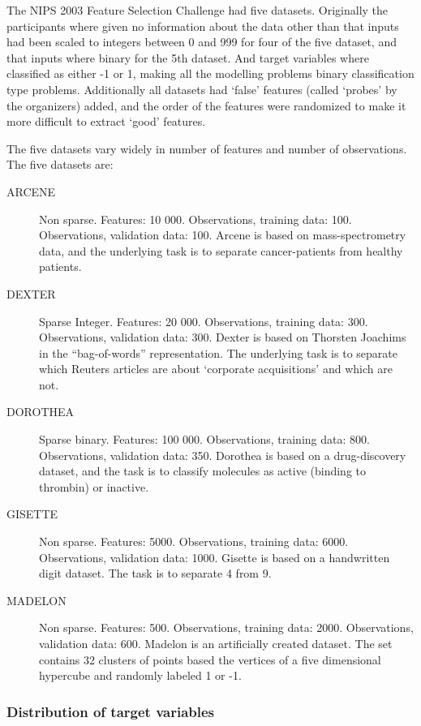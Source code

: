 \documentclass[12pt]{article}
\begin{document}
The NIPS 2003 Feature Selection Challenge had five datasets. Originally the participants where given no information about the data other than that inputs had been scaled to integers between 0 and 999 for four of the five dataset, and that inputs where binary for the 5th dataset. And target variables where classified as either -1 or 1, making all the modelling problems binary classification type problems. Additionally all datasets had `false' features (called `probes' by the organizers) added, and the order of the features were randomized to make it more difficult to extract `good' features.

The five datasets vary widely in number of features and number of observations. The five datasets are:
\begin{description}
\item [ARCENE] Non sparse. Features: 10 000. Observations, training data: 100. Observations, validation data: 100. Arcene is based on mass-spectrometry data, and the underlying task is to separate cancer-patients from healthy patients. 
\item [DEXTER] Sparse Integer. Features: 20 000. Observations, training data: 300. Observations, validation data: 300. Dexter is based on Thorsten Joachims in the “bag-of-words” representation. The underlying task is to separate which Reuters articles are about `corporate acquisitions' and which are not.
\item[DOROTHEA] Sparse binary. Features: 100 000.  Observations, training data: 800.  Observations, validation data: 350. Dorothea is based on a drug-discovery dataset, and the task is to classify molecules as active (binding to thrombin) or inactive.
\item[GISETTE] Non sparse. Features: 5000. Observations, training data: 6000. Observations, validation data: 1000. Gisette is based on a handwritten digit dataset. The task is to separate 4 from 9.
\item[MADELON] Non sparse. Features: 500. Observations, training data: 2000. Observations, validation data: 600. Madelon is an artificially created dataset. The set contains 32 clusters of points based the vertices of a five dimensional hypercube and randomly labeled 1 or -1.
\end{description}

\subsubsection{Distribution of target variables}
\end{document}
